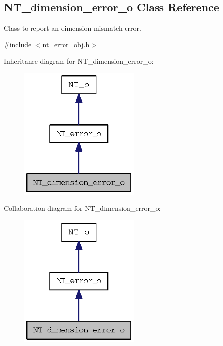 \subsection{NT\_\-dimension\_\-error\_\-o Class Reference}
\label{class_n_t__dimension__error__o}


Class to report an dimension mismatch error.  




{\ttfamily \#include $<$nt\_\-error\_\-obj.h$>$}



Inheritance diagram for NT\_\-dimension\_\-error\_\-o:
\nopagebreak
\begin{figure}[H]
\begin{center}
\leavevmode
\includegraphics[width=168pt]{class_n_t__dimension__error__o__inherit__graph}
\end{center}
\end{figure}


Collaboration diagram for NT\_\-dimension\_\-error\_\-o:
\nopagebreak
\begin{figure}[H]
\begin{center}
\leavevmode
\includegraphics[width=168pt]{class_n_t__dimension__error__o__coll__graph}
\end{center}
\end{figure}
